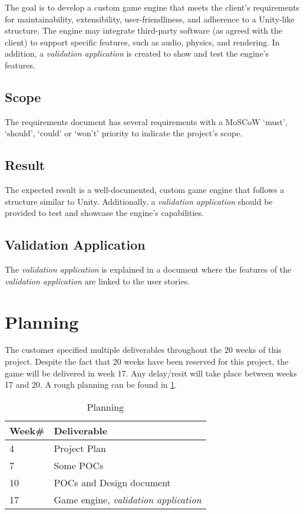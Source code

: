 \documentclass{projdoc}
\begin{document}
The goal is to develop a custom game engine that meets the client's requirements for maintainability, extensibility, user-friendliness, and adherence to a Unity-like structure. The engine may integrate third-party software (as agreed with the client) to support specific features, such as audio, physics, and rendering. In addition, a \emph{validation application} is created to show and test the engine's features.

\subsection{Scope}
The requirements document \autocite{crepe:requirements} has several requirements with a MoSCoW `must', `should', `could' or `won't' priority to indicate the project's scope.

\subsection{Result}

The expected result is a well-documented, custom game engine that follows a structure similar to Unity. Additionally, a \emph{validation application} should be provided to test and showcase the engine's capabilities.

\subsection{Validation Application}

The \emph{validation application} \autocite{crepe:validation-application} is explained in a document where the features of the \emph{validation application} are linked to the user stories.

\section{Planning}

The customer specified multiple deliverables throughout the 20 weeks of this project. Despite the fact that 20 weeks have been reserved for this project, the game will be delivered in week 17. Any delay/resit will take place between weeks 17 and 20. A rough planning can be found in \cref{tab:planning}.

\begin{table}
	\begin{tabularx}{\linewidth}{lX}
		\toprule
		\textbf{Week\#} & \textbf{Deliverable}\\
		\midrule
		4 & Project Plan\\
		7 & Some POCs\\
		10 & POCs and Design document\\
		17 & Game engine, \emph{validation application}\\
		\bottomrule
	\end{tabularx}
	\caption{Planning}
	\label{tab:planning}
\end{table}
\end{document}
